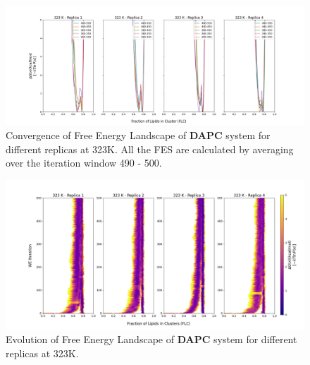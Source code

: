 \documentclass{biophys-new}
\begin{document}
\begin{figure}[hbt!]
\centering
\includegraphics[width=1.1\linewidth]{all_plots/ClusterLipids2Total/DPPC_DAPC_CHOL/323K/Convergence_DAPC_323_ClusterLipids2Total.png}
\caption{Convergence of Free Energy Landscape of \textbf{DAPC} system for different replicas at 323K. All the FES are calculated by averaging over the iteration window 490 - 500.}
\label{fig:view}

\end{figure}

\begin{figure}[hbt!]
\centering
\includegraphics[width=1.1\linewidth]{all_plots/ClusterLipids2Total/DPPC_DAPC_CHOL/323K/Evolution_DAPC_323_ClusterLipids2Total.png}
\caption{Evolution of Free Energy Landscape of \textbf{DAPC} system for different replicas at 323K.}
\label{fig:view}

\end{figure}
\end{document}
